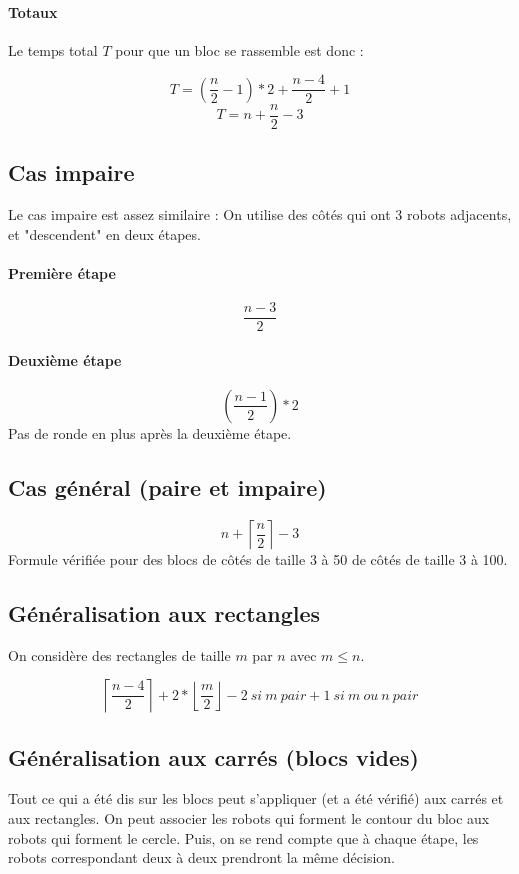 \documentclass[11pt, a4paper]{article}
\theoremstyle{plain}
\theoremstyle{definition}
\theoremstyle{remark}
\begin{document}
\paragraph{Totaux} Le temps total $T$ pour que un bloc se rassemble
est donc :

\[ T = ( \frac{n}{2} -1 ) *2 + \frac{n-4}{2} + 1 \]
\[ T = n + \frac{n}{2} - 3 \]


\subsection{Cas impaire}

Le cas impaire est assez similaire :
On utilise des côtés qui ont 3 robots adjacents, et "descendent" en deux
étapes.

\paragraph{Première étape}
\[ \frac{n-3}{2} \]

\paragraph{Deuxième étape}
\[ ( \frac{n-1}{2} ) *2 \]
Pas de ronde en plus après la deuxième étape.

\subsection{Cas général (paire et impaire)}
\[ n + \left\lceil \frac{n}{2} \right\rceil -3 \]
Formule vérifiée pour des blocs de côtés de taille 3 à 50 de côtés de taille 3
à 100.

\subsection{Généralisation aux rectangles}

On considère des rectangles de taille $m$ par $n$ avec $m \leq n$.

\[
    \left\lceil \frac{n-4}{2} \right\rceil
  + 2*\left\lfloor \frac{m}{2} \right\rfloor
  -2\ si\ m\ pair
  +1\ si\ m\ ou\ n\ pair
\]

\subsection{Généralisation aux carrés (blocs vides)}

Tout ce qui a été dis sur les blocs peut s'appliquer (et a été vérifié) aux
carrés et aux rectangles. On peut associer les robots qui forment le contour du
bloc aux robots qui forment le cercle. Puis, on se rend compte que à chaque
étape, les robots correspondant deux à deux prendront la même décision.
\end{document}
